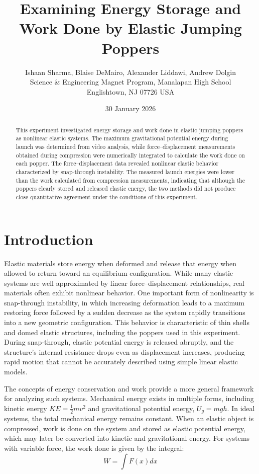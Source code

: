 \documentclass[12pt]{article}
\title{\textbf{Examining Energy Storage and Work Done by Elastic Jumping Poppers}}
\author{Ishaan Sharma, Blaise DeMairo, Alexander Liddawi, Andrew Dolgin \\
\small Science \& Engineering Magnet Program, Manalapan High School \\
\small Englishtown, NJ 07726 USA}
\date{30 January 2026}
\begin{document}
\maketitle

\begin{abstract}
This experiment investigated energy storage and work done in elastic jumping poppers as nonlinear elastic systems. The maximum gravitational potential energy during launch was determined from video analysis, while force--displacement measurements obtained during compression were numerically integrated to calculate the work done on each popper. The force--displacement data revealed nonlinear elastic behavior characterized by snap-through instability. The measured launch energies were lower than the work calculated from compression measurements, indicating that although the poppers clearly stored and released elastic energy, the two methods did not produce close quantitative agreement under the conditions of this experiment.
\end{abstract}

\section{Introduction}
Elastic materials store energy when deformed and release that energy when allowed to return toward an equilibrium configuration. While many elastic systems are well approximated by linear force--displacement relationships, real materials often exhibit nonlinear behavior. One important form of nonlinearity is snap-through instability, in which increasing deformation leads to a maximum restoring force followed by a sudden decrease as the system rapidly transitions into a new geometric configuration. This behavior is characteristic of thin shells and domed elastic structures, including the poppers used in this experiment. During snap-through, elastic potential energy is released abruptly, and the structure’s internal resistance drops even as displacement increases, producing rapid motion that cannot be accurately described using simple linear elastic models. 

The concepts of energy conservation and work provide a more general framework for analyzing such systems. Mechanical energy exists in multiple forms, including kinetic energy $KE = \frac{1}{2}mv^2$ and gravitational potential energy, $U_g = mgh$. In ideal systems, the total mechanical energy remains constant. When an elastic object is compressed, work is done on the system and stored as elastic potential energy, which may later be converted into kinetic and gravitational energy. For systems with variable force, the work done is given by the integral:
$$W = \int F(x)dx$$
\end{document}
